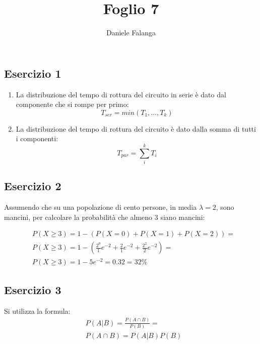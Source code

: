 \documentclass[12pt]{article}
\title{\textbf{Foglio 7}}
\author{Daniele Falanga}
\date{}
\begin{document}
\maketitle

\subsection*{Esercizio 1}

\begin{enumerate}
    \item La distribuzione del tempo di rottura del circuito in serie è dato dal componente che si rompe per primo:
    \[
    T_{ser} = min(T_1,\dots,T_k)    
    \]
    \item La distribuzione del tempo di rottura del circuito è dato dalla somma di tutti i componenti:
    \[
    T_{par} = \sum_{i}^{k}T_i    
    \]
\end{enumerate}

\subsection*{Esercizio 2}
Assumendo che su una popolazione di cento persone, in media \(\lambda = 2\), sono mancini, per calcolare la probabilità che almeno 3 siano mancini:

\begin{align*}
    &P(X \ge 3) = 1 - (P(X = 0) + P(X = 1) + P(X = 2)) = \\    
    &P(X \ge 3) = 1 - (\frac{2^0}{1}e^{-2} + \frac{2}{1}e^{-2} + \frac{2^2}{2}e^{-2}) = \\
    &P(X \ge 3) = 1-5e^{-2} = 0.32 = 32\%
\end{align*}  

\newpage
\subsection*{Esercizio 3}

Si utilizza la formula:
\begin{align*}
    &P(A|B) = \frac{P(A \cap B)}{P(B)} = \\
    &P(A \cap B) = P(A|B){P(B)}
\end{align*}
\end{document}
